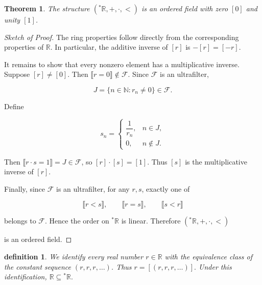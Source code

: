 \documentclass[10pt,a4paper]{book}
\newtheorem{definition}{definition}[section]
\newtheorem{theorem}{Theorem}[section]
\newenvironment{sketchofproof}
    {\begin{proof}[Sketch of Proof]}
    {\end{proof}}
\begin{document}
\begin{theorem}

    The structure
    $
        ({}^\ast\mathbb R,+,\cdot,<)
    $
    is an ordered field with zero \([0]\) and unity \([1]\).

\end{theorem}

\begin{sketchofproof}

    The ring properties follow directly from the corresponding properties of
    \(\mathbb R\). In particular, the additive inverse of \([r]\) is \(-[r]=[-r]\).

    It remains to show that every nonzero element has a multiplicative inverse.
    Suppose \([r]\neq[0]\). Then \(\llbracket r=0\rrbracket\notin\mathcal F\).
    Since \(\mathcal F\) is an ultrafilter,

    $$
        J=\{n\in\mathbb N:r_n\neq0\}\in\mathcal F.
    $$

    Define

    $$
        s_n=
        \begin{cases}
            \dfrac1{r_n}, & n\in J,    \\
            0,            & n\notin J.
        \end{cases}
    $$

    Then \(\llbracket r\cdot s=1\rrbracket=J\in\mathcal F\), so
    \([r]\cdot[s]=[1]\). Thus \([s]\) is the multiplicative inverse of \([r]\).

    Finally, since \(\mathcal F\) is an ultrafilter, for any \(r,s\), exactly one
    of

    $$
        \llbracket r<s\rrbracket,\qquad
        \llbracket r=s\rrbracket,\qquad
        \llbracket s<r\rrbracket
    $$

    belongs to \(\mathcal F\). Hence the order on \({}^\ast\mathbb R\) is linear.
    Therefore
    $
        ({}^\ast\mathbb R,+,\cdot,<)
    $

    is an ordered field.

\end{sketchofproof}

\begin{definition}

    We identify every real number \(r\in\mathbb R\) with the equivalence class of
    the constant sequence \((r,r,r,\ldots)\). Thus
    $
        r=[(r,r,r,\ldots)].
    $
    Under this identification,
    $
        \mathbb R\subseteq{}^\ast\mathbb R.
    $

\end{definition}
\end{document}
